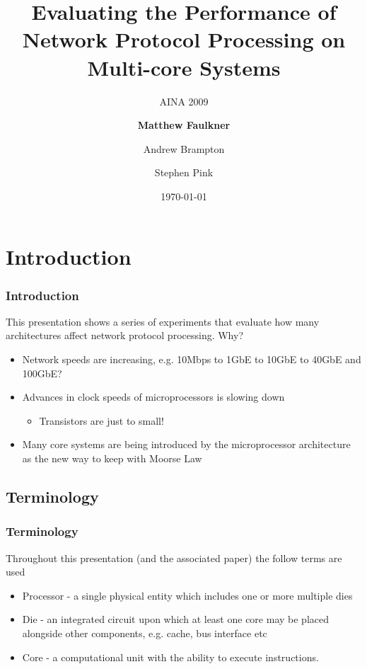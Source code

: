 \documentclass{beamer}
\title[Evaluating the Performance of Network Protocol Processing on Multi-core Systems] %
{Evaluating the Performance of Network Protocol Processing on Multi-core Systems\\}
\subtitle {AINA 2009}
\author[] %
{\textbf{Matthew Faulkner} \and Andrew Brampton \and Stephen Pink}
\institute[Lancaster University] %
{
  Computing Department\\
  Lancaster University\\
  Lancaster\\
}
\date[\today] %
{
\today
}
\begin{document}
\begin{frame}
  \titlepage
\end{frame}

\begin{frame}
\begin{footnotesize}
\tableofcontents
\end{footnotesize}  
\end{frame}

\section{Introduction}
\begin{frame}
  \frametitle{Introduction}
  	This presentation shows a series of experiments that evaluate how many architectures affect network protocol processing. Why?
	\begin{itemize}
		\item Network speeds are increasing, e.g. 10Mbps to 1GbE to 10GbE to 40GbE and 100GbE?
	 	\item Advances in clock speeds of microprocessors is slowing down
	 		\begin{itemize}
	 			\item Transistors are just to small!
	 		\end{itemize}
	 	\item Many core systems are being introduced by the microprocessor architecture as the new way to keep with Moorse Law
	\end{itemize}
\end{frame}

\subsection[Terms]{Terminology}

\begin{frame}
    \frametitle{Terminology}
	Throughout this presentation (and the associated paper) the follow terms are used
	\begin{itemize}
		\item Processor - a single physical entity which includes one or more multiple dies
		\item Die - an integrated circuit upon which at least one core may be placed alongside other components, e.g. cache, bus interface etc
		\item Core - a computational unit with the ability to execute instructions.
	\end{itemize}
\end{frame}
\end{document}

